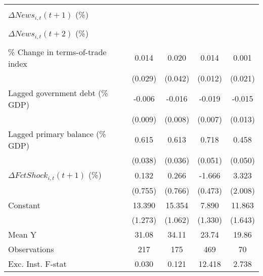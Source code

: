 {\begin{tabular}{l*{4}{c}}
                    &                     &                     &                     &                     \\
\addlinespace
$ \Delta News_{i,t}(t+1)$ (\%)&                     &                     &                     &                     \\
                    &                     &                     &                     &                     \\
\addlinespace
$ \Delta News_{i,t}(t+2)$ (\%)&                     &                     &                     &                     \\
                    &                     &                     &                     &                     \\
\addlinespace
\% Change in terms-of-trade index&       0.014         &       0.020         &       0.014         &       0.001         \\
                    &     (0.029)         &     (0.042)         &     (0.012)         &     (0.021)         \\
\addlinespace
Lagged government debt (\% GDP)&      -0.006         &      -0.016\sym{*}  &      -0.019\sym{**} &      -0.015         \\
                    &     (0.009)         &     (0.008)         &     (0.007)         &     (0.013)         \\
\addlinespace
Lagged primary balance (\% GDP)&       0.615\sym{***}&       0.613\sym{***}&       0.718\sym{***}&       0.458\sym{***}\\
                    &     (0.038)         &     (0.036)         &     (0.051)         &     (0.050)         \\
\addlinespace
$ \Delta FctShock_{i,t}(t+1)$ (\%)&       0.132         &       0.266         &      -1.666\sym{***}&       3.323         \\
                    &     (0.755)         &     (0.766)         &     (0.473)         &     (2.008)         \\
\addlinespace
Constant            &      13.390\sym{***}&      15.354\sym{***}&       7.890\sym{***}&      11.863\sym{***}\\
                    &     (1.273)         &     (1.062)         &     (1.330)         &     (1.643)         \\
\midrule
Mean Y              &       31.08         &       34.11         &       23.74         &       19.86         \\
Observations        &         217         &         175         &         469         &          70         \\
Exc. Inst. F-stat   &       0.030         &       0.121         &      12.418         &       2.738         \\
\bottomrule
\end{tabular}
}
